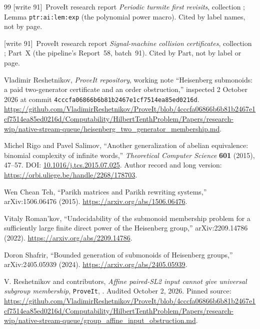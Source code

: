 \documentclass[11pt,letterpaper]{article}
\theoremstyle{definition}
\theoremstyle{remark}
\newcommand{\code}[1]{\nolinkurl{#1}}
\newcommand{\repo}{\texttt{ProveIt}}
\newcommand{\wtagd}{\textup{[write 91]}}
\begin{document}
\begin{thebibliography}{99}
\wtagd\ ProveIt research report \emph{Periodic turmite first revisits}, collection ; Lemma \texttt{ptr:ai:lem:exp} (the polynomial power macro). Cited by label names, not by page.

\wtagd\ ProveIt research report \emph{Signal-machine collision certificates}, collection ; Part~X (the pipeline's Report~58, batch~91). Cited by Part, not by label or page.

Vladimir Reshetnikov, \emph{ProveIt repository}, working note
``Heisenberg submonoids: a paid two-generator certificate and an order obstruction,''
inspected 2 October 2026 at commit \code{4cccfa06866b6b81b2467e1cf7514ea85ed0216d}.
\url{https://github.com/VladimirReshetnikov/ProveIt/blob/4cccfa06866b6b81b2467e1cf7514ea85ed0216d/Computability/HilbertTenthProblem/Papers/research-wip/native-stream-queue/heisenberg_two_generator_membership.md}.

Michel Rigo and Pavel Salimov,
``Another generalization of abelian equivalence: binomial complexity of infinite words,''
\emph{Theoretical Computer Science} \textbf{601} (2015), 47--57.
DOI: \href{https://doi.org/10.1016/j.tcs.2015.07.025}{10.1016/j.tcs.2015.07.025}.
Author record and long version: \url{https://orbi.uliege.be/handle/2268/178703}.

Wen Chean Teh,
``Parikh matrices and Parikh rewriting systems,''
arXiv:1506.06476 (2015).
\url{https://arxiv.org/abs/1506.06476}.

Vitaly Roman'kov,
``Undecidability of the submonoid membership problem for a sufficiently large finite direct power of the Heisenberg group,''
arXiv:2209.14786 (2022).
\url{https://arxiv.org/abs/2209.14786}.

Doron Shafrir,
``Bounded generation of submonoids of Heisenberg groups,''
arXiv:2405.05939 (2024).
\url{https://arxiv.org/abs/2405.05939}.

V. Reshetnikov and contributors, \emph{Affine paired-SL2 input cannot give universal subgroup membership}, \repo, . Audited October 2, 2026. Pinned source: \url{https://github.com/VladimirReshetnikov/ProveIt/blob/4cccfa06866b6b81b2467e1cf7514ea85ed0216d/Computability/HilbertTenthProblem/Papers/research-wip/native-stream-queue/group_affine_input_obstruction.md}.


\end{thebibliography}
\end{document}
